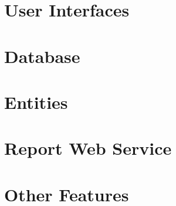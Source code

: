 \documentclass[14pt]{extreport}
\begin{document}
\chapter{User Interfaces}

\chapter{Database}

\chapter{Entities}

\chapter{Report Web Service}

\chapter{Other Features}
\end{document}
